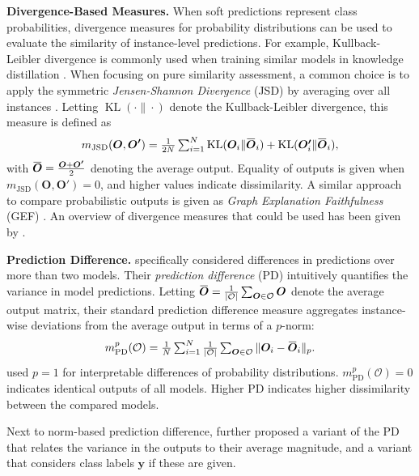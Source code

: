 \documentclass{article}
\newcommand{\citet}{\textcite}
\newcommand{\Out}{\bm{O}}
\newcommand{\Outp}{\bm{O'}}
\newcommand{\ols}[1]{\mskip.5\thinmuskip\overline{\mskip-.5\thinmuskip {#1} \mskip-.5\thinmuskip}\mskip.5\thinmuskip}
\newcommand{\subheader}{\textbf}
\begin{document}
\subheader{Divergence-Based Measures.}
When soft predictions represent class probabilities, divergence measures for probability distributions can be used to evaluate the similarity of instance-level predictions.
For example, Kullback-Leibler divergence is commonly used when training similar models in knowledge distillation \cite{gou2021knowledge}.
When focusing on pure similarity assessment, a common choice is to apply the symmetric \emph{Jensen-Shannon Divergence} (JSD) by averaging over all instances \cite{du_measuring_2023,fort_deep_2020, wu_similarity_2020}.
Letting $\operatorname{KL}(\cdot \| \cdot)$ denote the Kullback-Leibler divergence, this measure is defined as
\begin{equation}
    m_{\text{JSD}}(\Out, \Outp) =  \tfrac{1}{2N}\textstyle\sum_{i=1}^N
         \operatorname{KL}(\Out_i \| \ols{\Out}_i) +  \operatorname{KL}(\Outp_i \| \ols{\Out}_i),
\end{equation}
with $\ols{\Out} = \frac{\Out + \Outp}{2}$ denoting the average output.
Equality of outputs is given when  $m_{\text{JSD}}(\Out, \Outp) = 0$, and higher values indicate dissimilarity.
A similar approach to compare probabilistic outputs is given as \emph{Graph Explanation Faithfulness} (GEF) \cite{agarwal_evaluating_2023}.
An overview of divergence measures that could be used has been given by \citet{cha_comprehensive_2007}.


\subheader{Prediction Difference.}
\citet{shamir_anti-distillation_2020} specifically considered differences in predictions over more than two models.
Their \emph{prediction difference} (PD) intuitively quantifies the variance in model predictions.
Letting $\bm{\ols{\Out}}=\tfrac{1}{|\mathcal{O}|}\textstyle\sum_{\Out\in \mathcal{O}} \Out$ denote the average output matrix, their standard prediction difference measure aggregates instance-wise deviations from the average output in terms of a $p$-norm:
\begin{equation}
    m_{\text{PD}}^p(\mathcal{O}) = \tfrac{1}{N}\textstyle\sum_{i=1}^N \tfrac{1}{|\mathcal{O}|}\textstyle\sum_{\Out \in \mathcal{O}} \|\Out_{i} - \bm{\ols{\Out}}_i\|_p.
\end{equation}
\citet{shamir_anti-distillation_2020} used $p=1$ for interpretable differences of probability distributions.
$m_{\text{PD}}^p(\mathcal{O}) = 0$ indicates identical outputs of all models. Higher PD indicates higher dissimilarity between the compared models.

Next to norm-based prediction difference, \citet{shamir_anti-distillation_2020} further proposed a variant of the PD that relates the variance in the outputs to their average magnitude, and a variant that considers class labels $\bm{y}$ if these are given.
\end{document}
